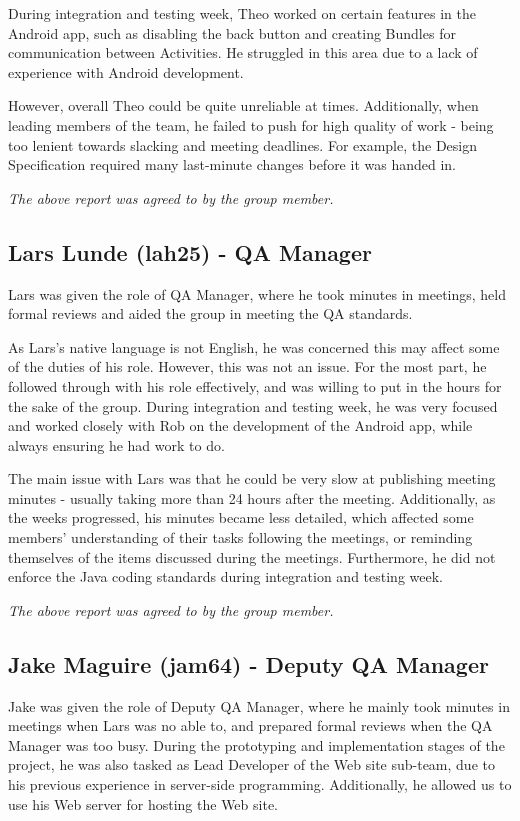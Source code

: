 \documentclass{project}
\begin{document}
During integration and testing week, Theo worked on certain features in the Android app, such as disabling the back button and creating Bundles for communication between Activities. He struggled in this area due to a lack of experience with Android development.

However, overall Theo could be quite unreliable at times. Additionally, when leading members of the team, he failed to push for high quality of work - being too lenient towards slacking and meeting deadlines. For example, the Design Specification required many last-minute changes before it was handed in.

\emph{The above report was agreed to by the group member.}


\newpage


\subsection{Lars Lunde (lah25) - QA Manager}
Lars was given the role of QA Manager, where he took minutes in meetings, held formal reviews and aided the group in meeting the QA standards.

As Lars’s native language is not English, he was concerned this may affect some of the duties of his role. However, this was not an issue. For the most part, he followed through with his role effectively, and was willing to put in the hours for the sake of the group. During integration and testing week, he was very focused and worked closely with Rob on the development of the Android app, while always ensuring he had work to do.

The main issue with Lars was that he could be very slow at publishing meeting minutes - usually taking more than 24 hours after the meeting. Additionally, as the weeks progressed, his minutes became less detailed, which affected some members’ understanding of their tasks following the meetings, or reminding themselves of the items discussed during the meetings. Furthermore, he did not enforce the Java coding standards during integration and testing week.

\emph{The above report was agreed to by the group member.}


\subsection{Jake Maguire (jam64) - Deputy QA Manager}
Jake was given the role of Deputy QA Manager, where he mainly took minutes in meetings when Lars was no able to, and prepared formal reviews when the QA Manager was too busy. During the prototyping and implementation stages of the project, he was also tasked as Lead Developer of the Web site sub-team, due to his previous experience in server-side programming. Additionally, he allowed us to use his Web server for hosting the Web site.
\end{document}
